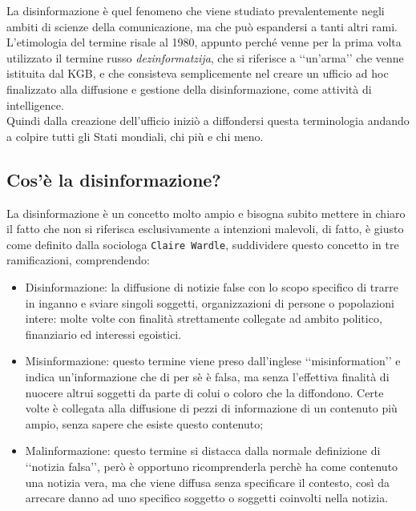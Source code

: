 \documentclass{article}
\begin{document}
\begin{justify}
    La disinformazione è quel fenomeno che viene studiato prevalentemente negli ambiti di scienze della comunicazione, ma che può espandersi a tanti altri rami.
    L'etimologia del termine risale al 1980, appunto perché venne per la prima volta utilizzato il termine russo \textit{dezinformatzija}, che si riferisce a ‘‘un'arma’’ che venne istituita dal KGB, e che consisteva semplicemente nel creare un ufficio ad hoc finalizzato alla diffusione e gestione della disinformazione, come attività di intelligence.\citep{DisWiki}\\
    Quindi dalla creazione dell'ufficio iniziò a diffondersi questa terminologia andando a colpire tutti gli Stati mondiali, chi più e chi meno.
\end{justify}

\centering\subsection{Cos'è la disinformazione?}

\begin{justify}
    La disinformazione è un concetto molto ampio e bisogna subito mettere in chiaro il fatto che non si riferisca esclusivamente a intenzioni malevoli, di fatto, è giusto come definito dalla sociologa \texttt{Claire Wardle}, suddividere questo concetto in tre ramificazioni, comprendendo:
\begin{itemize}
    \item Disinformazione: la diffusione di notizie false con lo scopo specifico di trarre in inganno e sviare singoli soggetti, organizzazioni di persone o popolazioni intere: molte volte con finalità strettamente collegate ad ambito politico, finanziario ed interessi egoistici.
    \item Misinformazione: questo termine viene preso dall'inglese ‘‘misinformation’’ e indica un'informazione che di per sè è falsa, ma senza l'effettiva finalità di nuocere altrui soggetti da parte di colui o coloro che la diffondono. Certe volte è collegata alla diffusione di pezzi di informazione di un contenuto più ampio, senza sapere che esiste questo contenuto;
    \item Malinformazione: questo termine si distacca dalla normale definizione di ‘‘notizia falsa’’, però è opportuno ricomprenderla perchè ha come contenuto una notizia vera, ma che viene diffusa senza specificare il contesto, così da arrecare danno ad uno specifico soggetto o soggetti coinvolti nella notizia. \citep{wardle2018information}
\end{itemize}
\end{justify}
\end{document}
